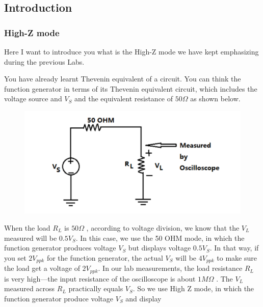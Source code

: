 \documentclass{article}
\begin{document}
\subsection{Introduction}
\subsubsection{High-Z mode}
Here I want to introduce you what is the High-Z mode we have kept emphasizing
during the previous Labs.

You have already learnt Thevenin equivalent of a circuit. You can think the
function generator in terms of its Thevenin equivalent circuit, which includes the
voltage source and $V_S$ and the equivalent resistance of $50\Omega$ as shown below.
\begin{figure}[H]
	\centering
	\includegraphics[width=0.7\linewidth]{p1}
	\label{fig:p1}
\end{figure}
When the load $R_L$ is $50\Omega$ , according to voltage division, we know that the $V_L$
measured will be $0.5V_S$. In this case, we use the 50 OHM mode, in which the
function generator produces voltage $V_S$ but displays voltage $0.5V_S$. In that way, if
you set $2V_{ppk}$ for the function generator, the actual $V_S$ will be $4V_{ppk}$ to make sure
the load get a voltage of $2V_{ppk}$. In our lab measurements, the load resistance $R_L$ is very high—the input resistance
of the oscilloscope is about $1 M\Omega$ . The $V_L$ measured across $R_L$ practically equals
$V_S$. So we use High Z mode, in which the function generator produce voltage $V_S$
and display
\end{document}
